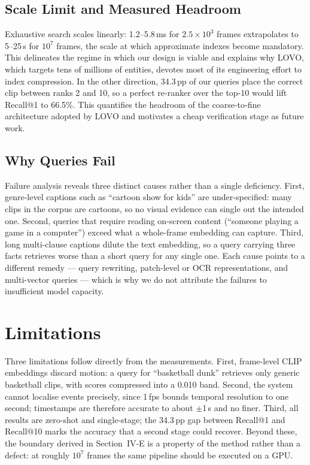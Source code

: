 \documentclass[journal]{IEEEtran}
\begin{document}
\subsection{Scale Limit and Measured Headroom}
Exhaustive search scales linearly: 1.2--5.8\,ms for $2.5\times10^{3}$ frames extrapolates to
5--25\,s for $10^{7}$ frames, the scale at which approximate indexes become mandatory. This
delineates the regime in which our design is viable and explains why LOVO, which targets tens of
millions of entities, devotes most of its engineering effort to index compression. In the other
direction, 34.3\,pp of our queries place the correct clip between ranks 2 and 10, so a perfect
re-ranker over the top-10 would lift Recall@1 to 66.5\%. This quantifies the headroom of the
coarse-to-fine architecture adopted by LOVO and motivates a cheap verification stage as future
work.

\subsection{Why Queries Fail}
Failure analysis reveals three distinct causes rather than a single deficiency. First,
genre-level captions such as ``cartoon show for kids'' are under-specified: many clips in the
corpus are cartoons, so no visual evidence can single out the intended one. Second, queries that
require reading on-screen content (``someone playing a game in a computer'') exceed what a
whole-frame embedding can capture. Third, long multi-clause captions dilute the text embedding,
so a query carrying three facts retrieves worse than a short query for any single one. Each cause
points to a different remedy --- query rewriting, patch-level or OCR representations, and
multi-vector queries --- which is why we do not attribute the failures to insufficient model
capacity.

\section{Limitations}

Three limitations follow directly from the measurements. First, frame-level CLIP embeddings
discard motion: a query for ``basketball dunk'' retrieves only generic basketball clips, with
scores compressed into a 0.010 band. Second, the system cannot localise events precisely, since
1\,fps bounds temporal resolution to one second; timestamps are therefore accurate to about
$\pm$1\,s and no finer. Third, all results are zero-shot and single-stage; the 34.3\,pp gap
between Recall@1 and Recall@10 marks the accuracy that a second stage could recover. Beyond
these, the boundary derived in Section~IV-E is a property of the method rather than a defect: at
roughly $10^{7}$ frames the same pipeline should be executed on a GPU.
\end{document}
